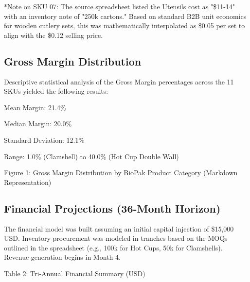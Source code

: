 \documentclass[12pt,a4paper]{article}
\begin{document}
*Note on SKU 07: The source spreadsheet listed the Utensils cost as "\$11-14" with an inventory note of "250k cartons." Based on standard B2B unit economics for wooden cutlery sets, this was mathematically interpolated as \$0.05 per set to align with the \$0.12 selling price.

\subsection{Gross Margin Distribution}

Descriptive statistical analysis of the Gross Margin percentages across the 11 SKUs yielded the following results:

Mean Margin: 21.4\%

Median Margin: 20.0\%

Standard Deviation: 12.1\%

Range: 1.0\% (Clamshell) to 40.0\% (Hot Cup Double Wall)

Figure 1: Gross Margin Distribution by BioPak Product Category (Markdown Representation)

\subsection{Financial Projections (36-Month Horizon)}

The financial model was built assuming an initial capital injection of \$15,000 USD. Inventory procurement was modeled in tranches based on the MOQs outlined in the spreadsheet (e.g., 100k for Hot Cups, 50k for Clamshells). Revenue generation begins in Month 4.

Table 2: Tri-Annual Financial Summary (USD)
\end{document}
